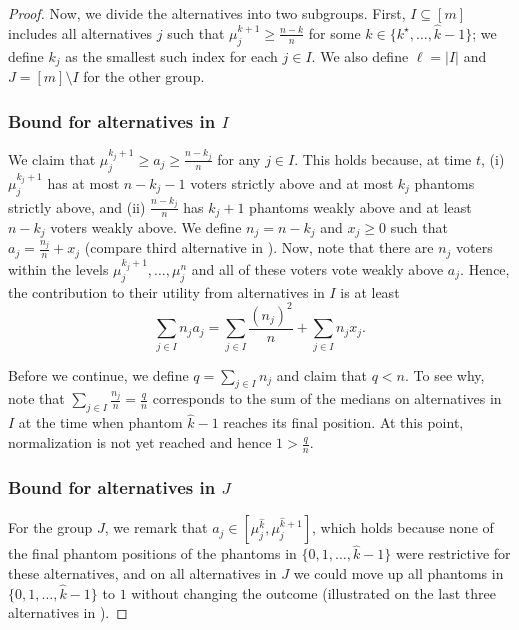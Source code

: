 \documentclass[11pt]{article}
\begin{document}
\begin{proof}
    Now, we divide the alternatives into two subgroups. First, $I \subseteq [m]$ includes all alternatives $j$ such that $\mu^{k+1}_j \geq \frac{n-k}{n}$ for some $k \in \{k^\star, \dots, \hat{k}-1\}$; we define $k_j$ as the smallest such index for each $j\in I$. We also define $\ell = |I|$ and $J = [m] \setminus I$ for the other group.

    \subsubsection*{Bound for alternatives in $I$} %
    We claim that $\mu^{k_j+1}_j \geq a_j \geq \frac{n-k_j}{n}$ for any $j \in I$. This holds because, at time $t$, (i) $\mu^{k_j+1}_j$ has at most $n-k_j - 1$ voters strictly above and at most $k_j$ phantoms strictly above, and (ii) $\frac{n-k_j}{n}$ has $k_j+1$ phantoms weakly above and at least $n-k_j$ voters weakly above. We define $n_j = n-k_j$ and $x_j \geq 0$ such that $a_j = \frac{n_j}{n} + x_j$ (compare third alternative in ). 
    Now, note that there are $n_j$ voters within the levels $\mu^{k_j + 1}_j, \dots, \mu^n_j$ and all of these voters vote weakly above $a_j$. Hence, the contribution to their utility from alternatives in $I$ is at least
    \begin{equation}\label{eq:mboundtwo}
        \sum_{j \in I} n_j a_j = \sum_{j \in I} \frac{(n_j)^2}{n}+ \sum_{j \in I}n_j x_j.
    \end{equation}

    Before we continue, we define $q = \sum_{j \in I} n_j$ and claim that $q < n$. 
    To see why, note that $\sum_{j \in I} \frac{n_j}{n} = \frac{q}{n}$ corresponds to the sum of the medians on alternatives in $I$ at the time when phantom $\hat{k}-1$ reaches its final position. At this point, normalization is not yet reached and hence $1 > \frac{q}{n}$.

    \subsubsection*{Bound for alternatives in $J$}
    
    
    For the group $J$, we remark that $a_j \in [\mu_j^{\hat{k}}, \mu_j^{\hat{k}+1}]$, which holds because none of the final phantom positions of the phantoms in $\{0, 1,\dots,\hat{k}-1\}$ were restrictive for these alternatives, and on all alternatives in $J$ we could move up all phantoms in $\{0, 1,\dots,\hat{k}-1\}$ to $1$ without changing the outcome (illustrated on the last three alternatives in ). 
    

\end{proof}
\end{document}
